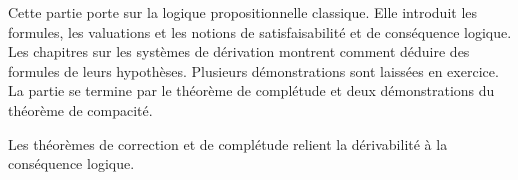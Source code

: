 \documentclass[../../include/open-logic-part]{subfiles}
\begin{document}
\begin{OLPartNotice}{}

Cette partie porte sur la logique
propositionnelle classique. Elle introduit les formules, les
valuations et les notions de satisfaisabilité et de
conséquence logique. Les chapitres sur les systèmes de
dérivation montrent comment déduire des formules de
leurs hypothèses. Plusieurs démonstrations sont laissées
en exercice. La partie se termine par le théorème de
complétude et deux démonstrations du théorème de
compacité.

Les théorèmes de correction et de complétude relient
la dérivabilité à la conséquence logique.
\end{OLPartNotice}










\OLEndPartHook
\end{document}
